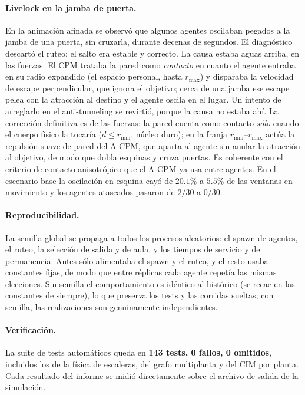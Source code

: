 \documentclass[11pt,a4paper]{article}
\begin{document}
\paragraph{Livelock en la jamba de puerta.}
En la animación afinada se observó que algunos agentes oscilaban pegados a la jamba de una puerta,
sin cruzarla, durante decenas de segundos. El diagnóstico descartó el ruteo: el salto era estable y
correcto. La causa estaba aguas arriba, en las fuerzas. El CPM trataba la pared como
\emph{contacto} en cuanto el agente entraba en su radio expandido (el espacio personal, hasta
$r_{\max}$) y disparaba la velocidad de escape perpendicular, que ignora el objetivo; cerca de una
jamba ese escape pelea con la atracción al destino y el agente oscila en el lugar. Un intento de
arreglarlo en el anti-tunneling se revirtió, porque la causa no estaba ahí. La corrección definitiva es de
las fuerzas: la pared cuenta como contacto \emph{sólo} cuando el cuerpo físico la tocaría
($d \le r_{\min}$, núcleo duro); en la franja $r_{\min}$--$r_{\max}$ actúa la repulsión suave de
pared del A-CPM, que aparta al agente sin anular la atracción al objetivo, de modo que dobla
esquinas y cruza puertas. Es coherente con el criterio de contacto anisotrópico que el A-CPM ya
usa entre agentes. En el escenario base la oscilación-en-esquina cayó de $20.1\%$ a $5.5\%$ de las
ventanas en movimiento y los agentes atascados pasaron de $2/30$ a $0/30$.

\paragraph{Reproducibilidad.}
La semilla global se propaga a todos los procesos aleatorios: el spawn de agentes, el ruteo, la
selección de salida y de aula, y los tiempos de servicio y de permanencia. Antes sólo alimentaba
el spawn y el ruteo, y el resto usaba constantes fijas, de modo que entre réplicas cada agente
repetía las mismas elecciones. Sin semilla el comportamiento es idéntico al histórico (se recae en
las constantes de siempre), lo que preserva los tests y las corridas sueltas; con semilla, las
realizaciones son genuinamente independientes.

\paragraph{Verificación.}
La suite de tests automáticos queda en \textbf{143 tests, 0 fallos, 0 omitidos}, incluidos los
de la física de escaleras, del grafo multiplanta y del CIM por planta. Cada resultado del
informe se midió directamente sobre el archivo de salida de la simulación.
\end{document}
